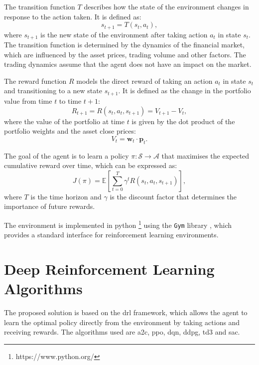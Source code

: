 The transition function $T$ describes how the state of the environment changes in response to the action taken. It is defined as:
\begin{equation}
    s_{t+1} = T(s_t, a_t),
\end{equation}
where $s_{t+1}$ is the new state of the environment after taking action $a_t$ in state $s_t$. The transition function is determined by the dynamics of the financial market, which are influenced by the asset prices, trading volume and other factors. The trading dynamics assume that the agent does not have an impact on the market. 

The reward function $R$ models the direct reward of taking an action $a_t$ in state $s_t$ and transitioning to a new state $s_{t+1}$. It is defined as the change in the portfolio value from time $t$ to time $t+1$:
\begin{equation}
    R_{t+1} = R(s_t, a_t, s_{t+1}) = V_{t+1} - V_t,
\end{equation}
where the value of the portfolio at time $t$ is given by the dot product of the portfolio weights and the asset close prices:
\begin{equation}
    V_t = \mathbf{w}_t \cdot \mathbf{p}_t.
\end{equation}

The goal of the agent is to learn a policy $\pi: \mathcal{S} \to \mathcal{A}$ that maximises the expected cumulative reward over time, which can be expressed as:
\begin{equation}
    J(\pi) = \mathbb{E} \left[\sum_{t=0}^{T} \gamma^t R(s_t, a_t, s_{t+1}) \right],
\end{equation} 
where $T$ is the time horizon and $\gamma$ is the discount factor that determines the importance of future rewards. 

The environment is implemented in \Gls{python} \footnote{https://www.python.org/} using the \texttt{Gym} library \cite{Brockman2016}, which provides a standard interface for reinforcement learning environments. 

\section{Deep Reinforcement Learning Algorithms} \label{sec:drl-algorithms}

The proposed solution is based on the \acrshort{drl} framework, which allows the agent to learn the optimal policy directly from the environment by taking actions and receiving rewards. The algorithms used are \acrfull{a2c}, \acrfull{ppo}, \acrfull{dqn}, \acrfull{ddpg}, \acrfull{td3} and \acrfull{sac}.

